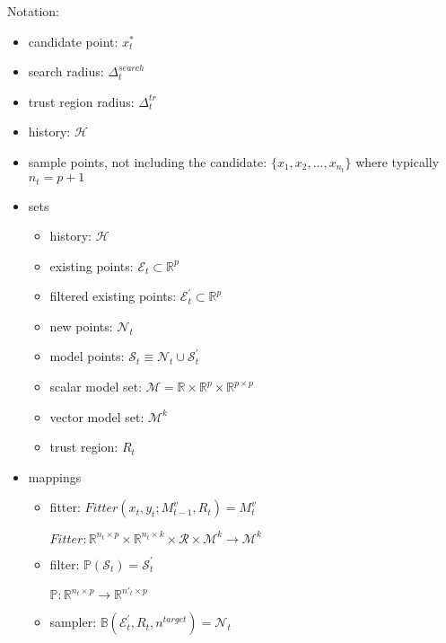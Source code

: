 Notation:
\begin{itemize}
    \item candidate point: $x^*_t$
    \item search radius: $\Delta_t^{search}$
    \item trust region radius: $\Delta_t^{tr}$
    \item history: $\mathcal{H}$
    \item sample points, not including the candidate: $\{x_1, x_2,...,x_{n_t}\}$ where typically $n_t=p+1$
\end{itemize}

\begin{itemize}
    \item sets
        \begin{itemize}
            \item history: $\mathcal{H}$
            \item existing points: $\mathcal{E}_t\subset\mathbb{R}^{p}$
            \item filtered existing points: $\mathcal{E}^{'}_t\subset\mathbb{R}^{p}$
            \item new points: $\mathcal{N}_t$
            \item model points: $\mathcal{S}_t\equiv\mathcal{N}_t\cup\mathcal{S}^{'}_t$
            \item scalar model set: $\mathcal{M}= \mathbb{R}\times\mathbb{R}^p\times\mathbb{R}^{p\times p}$
            \item vector model set: $\mathcal{M}^k$
            \item trust region: $R_t$

        \end{itemize}
    \item mappings
        \begin{itemize}
            \item fitter: $Fitter(x_t,y_t;M^v_{t-1},R_t)=M_{t}^v$

                    $Fitter:\mathbb{R}^{n_t\times p}\times\mathbb{R}^{n_t\times k}\times\mathcal{R}\times\mathcal{M}^k\rightarrow\mathcal{M}^k$

            \item filter: $\mathbb{P}(\mathcal{S}_t)=\mathcal{S}_t^{'}$

                        $\mathbb{P}: \mathbb{R}^{n_t\times p}\rightarrow\mathbb{R}^{n{'}_t\times p}$
            \item sampler: $\mathbb{B}(\mathcal{E}_t^{'},R_t,n^{target})=\mathcal{N}_t$
        \end{itemize}





\end{itemize}
